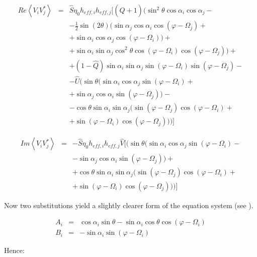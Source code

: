 \documentclass[a4paper,14pt]{extbook}
\begin{document}
\begin{eqnarray}
Re \left\langle V_i V_j^{*}\right\rangle &=& \hat{S}\eta_0 h_{eff,i} h_{eff,j}[(\hat{Q}+1) (\sin^2 \theta \cos \alpha_i \cos \alpha_j - \\
& & - \frac{1}{2}  \sin(2\theta) (\sin \alpha_j \cos \alpha_i \cos(\varphi - \Omega_j)+\nonumber \\
& & +\sin \alpha_i \cos \alpha_j \cos(\varphi - \Omega_i) ) + \nonumber \\
& & + \sin \alpha_i \sin \alpha_j \cos^2\theta \cos(\varphi - \Omega_i) \cos(\varphi - \Omega_j))+ \nonumber \\
& & + (1-\hat{Q}) \sin \alpha_i \sin \alpha_j \sin (\varphi - \Omega_i) \sin (\varphi - \Omega_j)-\nonumber \\
& & -\hat{U} (\sin \theta(\sin \alpha_i \cos \alpha_j \sin (\varphi - \Omega_i) +  \nonumber \\
& & + \sin \alpha_j \cos \alpha_i \sin (\varphi - \Omega_j))- \nonumber \\
& & - \cos \theta \sin \alpha_i \sin \alpha_j(\sin (\varphi - \Omega_j) \cos (\varphi - \Omega_i)+ \nonumber \\
& & + \sin (\varphi - \Omega_i) \cos (\varphi - \Omega_j) ) )]\nonumber
\end{eqnarray}

\begin{eqnarray}
Im \left\langle V_i V_j^{*}\right\rangle &=& - \hat{S}\eta_0 h_{eff,i} h_{eff,j} \hat{V}[ (\sin \theta(\sin \alpha_i \cos \alpha_j \sin (\varphi - \Omega_i) - \nonumber \\
& & - \sin \alpha_j \cos \alpha_i \sin (\varphi - \Omega_j))+  \\
& & +\cos \theta \sin \alpha_i \sin \alpha_j(\sin (\varphi - \Omega_j) \cos (\varphi - \Omega_i)+ \nonumber \\
& & + \sin (\varphi - \Omega_i) \cos (\varphi - \Omega_j) ) )]\nonumber
\end{eqnarray}

Now two substitutions yield a slightly clearer form of the equation system (see \cite{cecconi04}).

\begin{eqnarray}
A_i &=& \cos \alpha_i \sin \theta - \sin \alpha_i \cos \theta \cos (\varphi - \Omega_i)\label{A_i} \\
B_i &=& -\sin \alpha_i \sin (\varphi - \Omega_i) \label{B_i}
\end{eqnarray}

Hence:
\end{document}
